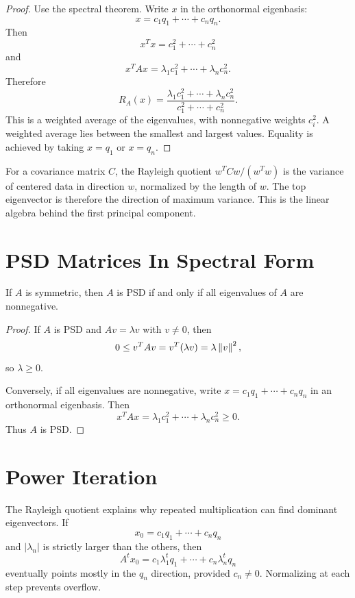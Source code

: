 \begin{proof}
Use the spectral theorem. Write $x$ in the orthonormal eigenbasis:
\[
  x=c_1q_1+\cdots+c_nq_n.
\]
Then
\[
  x^Tx=c_1^2+\cdots+c_n^2
\]
and
\[
  x^TAx=\lambda_1c_1^2+\cdots+\lambda_nc_n^2.
\]
Therefore
\[
  R_A(x)=
  \frac{\lambda_1c_1^2+\cdots+\lambda_nc_n^2}
       {c_1^2+\cdots+c_n^2}.
\]
This is a weighted average of the eigenvalues, with nonnegative weights
$c_i^2$. A weighted average lies between the smallest and largest values.
Equality is achieved by taking $x=q_1$ or $x=q_n$.
\end{proof}

\begin{aimlbox}
For a covariance matrix $C$, the Rayleigh quotient
$w^TCw/(w^Tw)$ is the variance of centered data in direction $w$, normalized
by the length of $w$. The top eigenvector is therefore the direction of
maximum variance. This is the linear algebra behind the first principal
component.
\end{aimlbox}

\section{PSD Matrices In Spectral Form}

\begin{proposition}
If $A$ is symmetric, then $A$ is PSD if and only if all eigenvalues of $A$ are
nonnegative.
\end{proposition}

\begin{proof}
If $A$ is PSD and $Av=\lambda v$ with $v\neq 0$, then
\[
  0\leq v^TAv=v^T(\lambda v)=\lambda\left\lVert v \right\rVert^2,
\]
so $\lambda\geq 0$.

Conversely, if all eigenvalues are nonnegative, write
$x=c_1q_1+\cdots+c_nq_n$ in an orthonormal eigenbasis. Then
\[
  x^TAx=\lambda_1c_1^2+\cdots+\lambda_nc_n^2\geq 0.
\]
Thus $A$ is PSD.
\end{proof}

\section{Power Iteration}

The Rayleigh quotient explains why repeated multiplication can find dominant
eigenvectors. If
\[
  x_0=c_1q_1+\cdots+c_nq_n
\]
and $|\lambda_n|$ is strictly larger than the others, then
\[
  A^t x_0
  =
  c_1\lambda_1^tq_1+\cdots+c_n\lambda_n^tq_n
\]
eventually points mostly in the $q_n$ direction, provided $c_n\neq 0$.
Normalizing at each step prevents overflow.


